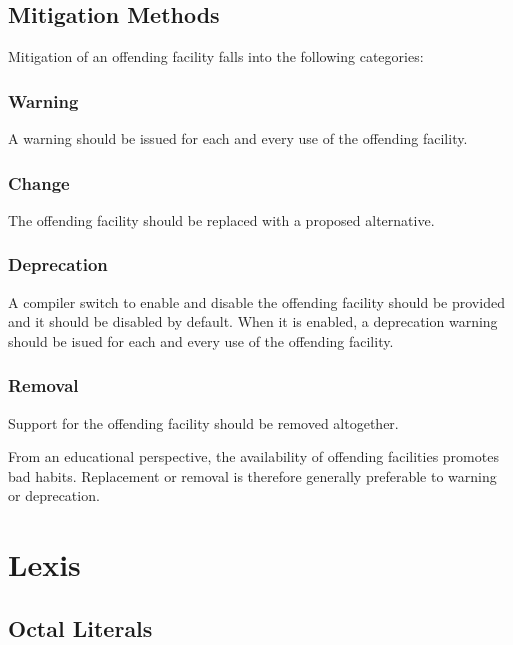 \documentclass[10pt,a4paper]{article}
\begin{document}
\subsection{Mitigation Methods}

Mitigation of an offending facility falls into the following categories:

\subsubsection{Warning}

A warning should be issued for each and every use of the offending facility.

\subsubsection{Change}

The offending facility should be replaced with a proposed alternative.

\subsubsection{Deprecation}

A compiler switch to enable and disable the offending facility should be
provided and it should be disabled by default. When it is enabled, a deprecation
warning should be isued for each and every use of the offending facility.

\subsubsection{Removal}

Support for the offending facility should be removed altogether.\\

\par\noindent From an educational perspective, the availability of offending
facilities promotes bad habits. Replacement or removal is therefore generally
preferable to warning or deprecation.


\section{Lexis}

\subsection{Octal Literals}
\end{document}
